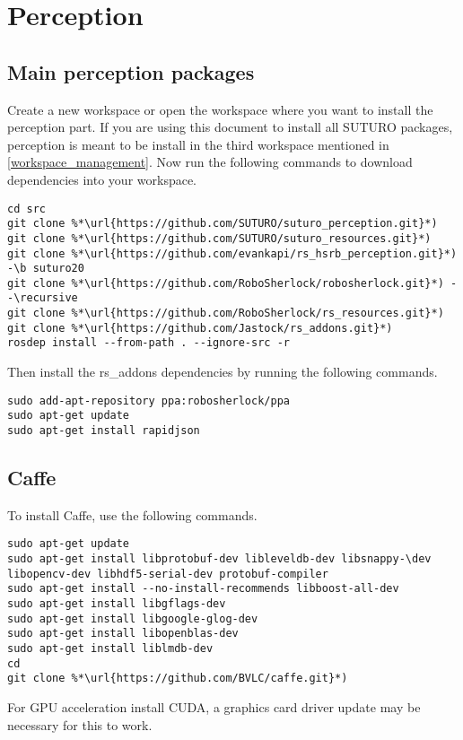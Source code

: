 \documentclass[main.tex]{subfiles}
\begin{document}
 \section{Perception}
 \subsection{Main perception packages}
 Create a new workspace or open the workspace where you want to install the perception part. If you are using this document to install all SUTURO packages, perception is meant to be install in the third workspace mentioned in \ref{workspace_management}. Now run the following commands to download dependencies into your workspace.
 
 \begin{lstlisting}
cd src
git clone %*\url{https://github.com/SUTURO/suturo_perception.git}*)
git clone %*\url{https://github.com/SUTURO/suturo_resources.git}*) 
git clone %*\url{https://github.com/evankapi/rs_hsrb_perception.git}*) -\b suturo20
git clone %*\url{https://github.com/RoboSherlock/robosherlock.git}*) --\recursive
git clone %*\url{https://github.com/RoboSherlock/rs_resources.git}*)
git clone %*\url{https://github.com/Jastock/rs_addons.git}*)
rosdep install --from-path . --ignore-src -r 
\end{lstlisting}
 
 Then install the rs\_addons dependencies by running the following commands.
 \begin{lstlisting}
sudo add-apt-repository ppa:robosherlock/ppa
sudo apt-get update
sudo apt-get install rapidjson 
\end{lstlisting}
 
\subsection{Caffe}
To install Caffe, use the following commands.
 \begin{lstlisting}
sudo apt-get update
sudo apt-get install libprotobuf-dev libleveldb-dev libsnappy-\dev libopencv-dev libhdf5-serial-dev protobuf-compiler
sudo apt-get install --no-install-recommends libboost-all-dev
sudo apt-get install libgflags-dev
sudo apt-get install libgoogle-glog-dev
sudo apt-get install libopenblas-dev
sudo apt-get install liblmdb-dev
cd 
git clone %*\url{https://github.com/BVLC/caffe.git}*)
\end{lstlisting}
 
 For GPU acceleration install CUDA, a graphics card driver update may be necessary for this to work.
 
\end{document}
